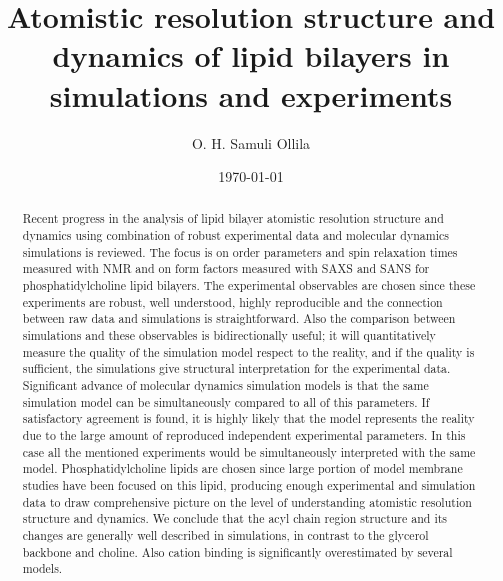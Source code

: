 \documentclass[aps,prl,superscriptaddress,twocolumn]{revtex4}
\begin{document}

\title{Atomistic resolution structure and dynamics of lipid bilayers in simulations and experiments} %



\author{O. H. Samuli Ollila}



\date{\today}

\begin{abstract}
Recent progress in the analysis of lipid bilayer atomistic resolution structure and dynamics
using combination of robust experimental data and molecular dynamics simulations is reviewed.
The focus is on order parameters and spin relaxation times measured with NMR and on form factors
measured with SAXS and SANS for phosphatidylcholine lipid bilayers. The experimental observables
are chosen since these experiments are robust, well understood, highly reproducible and the connection
between raw data and simulations is straightforward. Also the comparison between simulations
and these observables is bidirectionally useful; it will quantitatively measure the quality 
of the simulation model respect to the reality, and if the quality is sufficient, the simulations
give structural interpretation for the experimental data. Significant advance of molecular dynamics
simulation models is that the same simulation model can be simultaneously compared to all of
this parameters. If satisfactory agreement is found, it is highly likely that the model
represents the reality due to the large amount of reproduced independent experimental parameters. 
In this case all the mentioned experiments would be simultaneously interpreted with the same model.
Phosphatidylcholine lipids are chosen since large portion of model membrane studies have been 
focused on this lipid, producing enough experimental and simulation data to draw comprehensive
picture on the level of understanding atomistic resolution structure and dynamics.
We conclude that the acyl chain region structure and its changes are generally well described in simulations, 
in contrast to the glycerol backbone and choline. Also cation binding is significantly overestimated
by several models.

\end{abstract}
\end{document}

